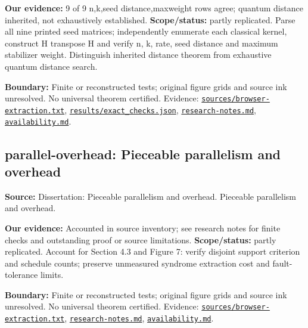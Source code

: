 \documentclass[11pt]{article}
\begin{document}
\textbf{Our evidence:} 9 of 9 n,k,seed distance,maxweight rows agree; quantum distance inherited, not exhaustively established. \textbf{Scope/status:} partly replicated. Parse all nine printed seed matrices; independently enumerate each classical kernel, construct H transpose H and verify n, k, rate, seed distance and maximum stabilizer weight. Distinguish inherited distance theorem from exhaustive quantum distance search.

\textbf{Boundary:} Finite or reconstructed tests; original figure grids and source ink unresolved. No universal theorem certified. Evidence: \href{https://github.com/alectionary/vibe-math/blob/master/formalization/quintavalle-hgp/sources/browser-extraction.txt}{\nolinkurl{sources/browser-extraction.txt}}, \href{https://github.com/alectionary/vibe-math/blob/master/formalization/quintavalle-hgp/results/exact_checks.json}{\nolinkurl{results/exact_checks.json}}, \href{https://github.com/alectionary/vibe-math/blob/master/formalization/quintavalle-hgp/research-notes.md}{\nolinkurl{research-notes.md}}, \href{https://github.com/alectionary/vibe-math/blob/master/formalization/quintavalle-hgp/availability.md}{\nolinkurl{availability.md}}.
\subsection{parallel-overhead: Pieceable parallelism and overhead}
\label{claim:parallel-overhead}
\textbf{Source:} Dissertation: Pieceable parallelism and overhead. Pieceable parallelism and overhead.

\textbf{Our evidence:} Accounted in source inventory; see research notes for finite checks and outstanding proof or source limitations. \textbf{Scope/status:} partly replicated. Account for Section 4.3 and Figure 7: verify disjoint support criterion and schedule counts; preserve unmeasured syndrome extraction cost and fault-tolerance limits.

\textbf{Boundary:} Finite or reconstructed tests; original figure grids and source ink unresolved. No universal theorem certified. Evidence: \href{https://github.com/alectionary/vibe-math/blob/master/formalization/quintavalle-hgp/sources/browser-extraction.txt}{\nolinkurl{sources/browser-extraction.txt}}, \href{https://github.com/alectionary/vibe-math/blob/master/formalization/quintavalle-hgp/research-notes.md}{\nolinkurl{research-notes.md}}, \href{https://github.com/alectionary/vibe-math/blob/master/formalization/quintavalle-hgp/availability.md}{\nolinkurl{availability.md}}.
\end{document}
